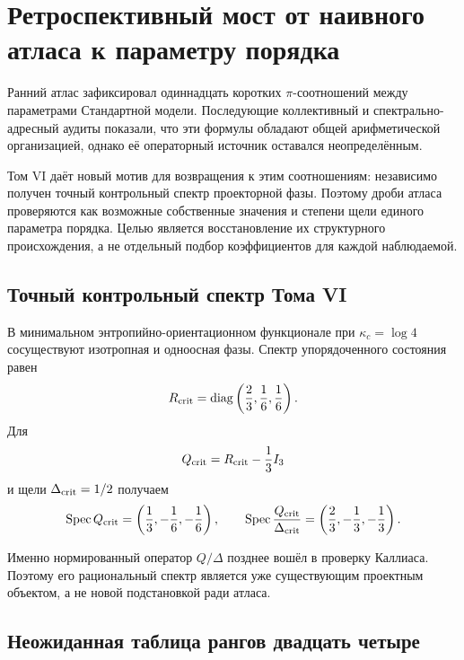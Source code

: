 \chapter{Ретроспективный мост от наивного атласа к параметру порядка}

Ранний атлас зафиксировал одиннадцать коротких $\pi$-соотношений между
параметрами Стандартной модели. Последующие коллективный и
спектрально-адресный аудиты показали, что эти формулы обладают общей
арифметической организацией, однако её операторный источник оставался
неопределённым.

Том VI даёт новый мотив для возвращения к этим соотношениям: независимо
получен точный контрольный спектр проекторной фазы. Поэтому дроби атласа
проверяются как возможные собственные значения и степени щели единого
параметра порядка. Целью является восстановление их структурного
происхождения, а не отдельный подбор коэффициентов для каждой
наблюдаемой.

\section{Точный контрольный спектр Тома VI}

В минимальном энтропийно-ориентационном функционале при
$\kappa_c=\log4$ сосуществуют изотропная и одноосная фазы. Спектр
упорядоченного состояния равен
\begin{equation}
 R_{\rm crit}=\operatorname{diag}
 \left(\frac23,\frac16,\frac16\right).
 \label{eq:v6-atlas-critical-R}
\end{equation}
Для
\begin{equation}
 Q_{\rm crit}=R_{\rm crit}-\frac13I_3
\end{equation}
и щели $\Delta_{\rm crit}=1/2$ получаем
\begin{equation}
 \operatorname{Spec} Q_{\rm crit}
 =\left(\frac13,-\frac16,-\frac16\right),
 \qquad
 \operatorname{Spec}\frac{Q_{\rm crit}}{\Delta_{\rm crit}}
 =\left(\frac23,-\frac13,-\frac13\right).
 \label{eq:v6-atlas-normalized-Q}
\end{equation}

Именно нормированный оператор $Q/\Delta$ позднее вошёл в проверку Каллиаса.
Поэтому его рациональный спектр является уже существующим проектным
объектом, а не новой подстановкой ради атласа.

\section{Неожиданная таблица рангов двадцать четыре}

